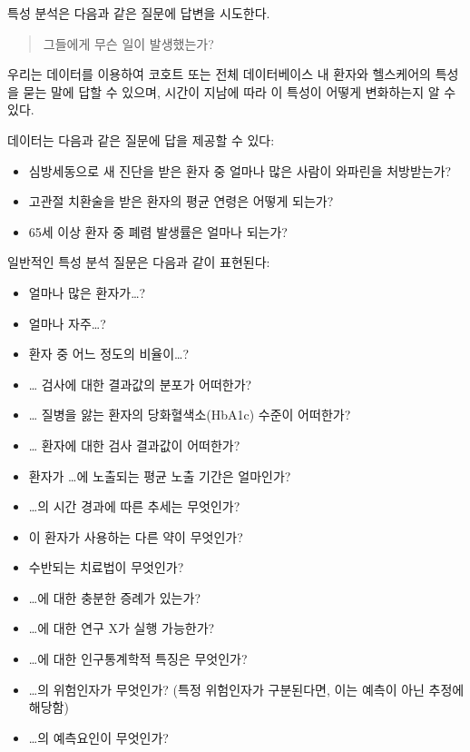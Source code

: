\documentclass[10.5pt]{book}
\providecommand{\tightlist}{%
  \setlength{\itemsep}{0pt}\setlength{\parskip}{0pt}}
\theoremstyle{definition}
\theoremstyle{definition}
\theoremstyle{definition}
\theoremstyle{remark}
\begin{document}

특성 분석은 다음과 같은 질문에 답변을 시도한다.

\begin{quote}
그들에게 무슨 일이 발생했는가?
\end{quote}

우리는 데이터를 이용하여 코호트 또는 전체 데이터베이스 내 환자와
헬스케어의 특성을 묻는 말에 답할 수 있으며, 시간이 지남에 따라 이 특성이
어떻게 변화하는지 알 수 있다.

데이터는 다음과 같은 질문에 답을 제공할 수 있다:

\begin{itemize}
\tightlist
\item
  심방세동으로 새 진단을 받은 환자 중 얼마나 많은 사람이 와파린을
  처방받는가?
\item
  고관절 치환술을 받은 환자의 평균 연령은 어떻게 되는가?
\item
  65세 이상 환자 중 폐렴 발생률은 얼마나 되는가?
\end{itemize}

일반적인 특성 분석 질문은 다음과 같이 표현된다:

\begin{itemize}
\tightlist
\item
  얼마나 많은 환자가\ldots{}?
\item
  얼마나 자주\ldots{}?
\item
  환자 중 어느 정도의 비율이\ldots{}?
\item
  \ldots{} 검사에 대한 결과값의 분포가 어떠한가?
\item
  \ldots{} 질병을 앓는 환자의 당화혈색소(HbA1c) 수준이 어떠한가?
\item
  \ldots{} 환자에 대한 검사 결과값이 어떠한가?
\item
  환자가 \ldots{}에 노출되는 평균 노출 기간은 얼마인가?
\item
  \ldots{}의 시간 경과에 따른 추세는 무엇인가?
\item
  이 환자가 사용하는 다른 약이 무엇인가?
\item
  수반되는 치료법이 무엇인가?
\item
  \ldots{}에 대한 충분한 증례가 있는가?
\item
  \ldots{}에 대한 연구 X가 실행 가능한가?
\item
  \ldots{}에 대한 인구통계학적 특징은 무엇인가?
\item
  \ldots{}의 위험인자가 무엇인가? (특정 위험인자가 구분된다면, 이는
  예측이 아닌 추정에 해당함)
\item
  \ldots{}의 예측요인이 무엇인가?
\end{itemize}
\end{document}
